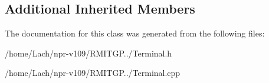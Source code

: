 \subsection*{Additional Inherited Members}


The documentation for this class was generated from the following files\+:\begin{DoxyCompactItemize}
\item 
/home/\+Lach/npr-\/v109/\+R\+M\+I\+T\+G\+P../Terminal.\+h\item 
/home/\+Lach/npr-\/v109/\+R\+M\+I\+T\+G\+P../Terminal.\+cpp\end{DoxyCompactItemize}
